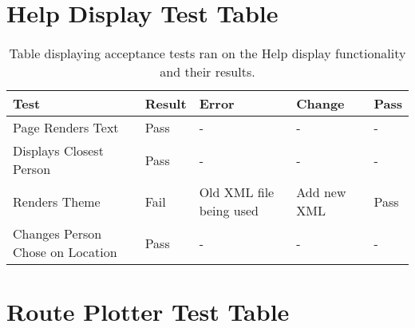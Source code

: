 \section{Help Display Test Table}
\begin{table}[H]
\begin{tabular}{|l|l|l|l|l|}
\hline
\textbf{Test}                    & \textbf{Result} & \textbf{Error}          & \textbf{Change} & \textbf{Pass} \\ \hline
Page Renders Text                & Pass            & -                       & -               & -             \\ \hline
Displays Closest Person          & Pass            & -                       & -               & -             \\ \hline
Renders Theme                    & Fail            & Old XML file being used & Add new XML     & Pass          \\ \hline
Changes Person Chose on Location & Pass            & -                       & -               & -             \\ \hline
\end{tabular}
\caption[Help Display Tests]{Table displaying acceptance tests ran on the Help display functionality and their results.}
\end{table}
\section{Route Plotter Test Table}

